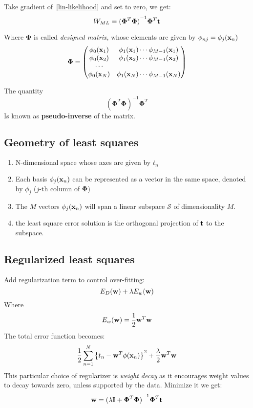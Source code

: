 Take gradient of~\ref{lin-likelihood} and set to zero, we get:
\begin{equation}
    W_{ML} = {(\boldsymbol\Phi^T\boldsymbol\Phi)}^{-1}\boldsymbol\Phi^T
    \boldsymbol{\mathsf{t}}
\end{equation}

Where $\boldsymbol\Phi$ is called \emph{designed matrix}, whose elements are
given by $\phi_{nj} = \phi_j(\mathbf{x}_n)$
\begin{equation}
    \boldsymbol\Phi = \begin{pmatrix}
        \phi_0(\mathbf{x}_1) & \phi_1(\mathbf{x}_1) \cdots \phi_{M-1}(\mathbf{x}_1) \\
        \phi_0(\mathbf{x}_2) & \phi_1(\mathbf{x}_2) \cdots \phi_{M-1}(\mathbf{x}_2)\\
        \cdots \\
        \phi_0(\mathbf{x}_N) & \phi_1(\mathbf{x}_N) \cdots \phi_{M-1}(\mathbf{x}_N) 
    \end{pmatrix}
\end{equation}

The quantity
\begin{equation}
    {(\boldsymbol\Phi^T\boldsymbol\Phi)}^{-1}\boldsymbol\Phi^T
\end{equation}
Is known as \textbf{pseudo-inverse} of the matrix.
\subsection{Geometry of least squares}
\begin{enumerate}
    \item N-dimensional space whose axes are given by $t_n$
    \item Each basis $\phi_j(\mathbf{x}_n)$ can be represented as a vector in the
    same space, denoted by $\phi_j$ ($j$-th column of $\boldsymbol\Phi$)
    \item The $M$ vectors $\phi_j(\mathbf{x}_n)$ will span a linear subspace
        $\mathcal{S}$ of dimensionality $M$.
    \item the least square error solution is the orthogonal projection of
        $\boldsymbol{\mathsf{t}}$ to the subspace.
\end{enumerate}

\subsection{Regularized least squares}
Add regularization term to control over-fitting:
\[ E_D(\mathbf{w}) + \lambda E_w(\mathbf{w})\]
Where
\[ E_w(\mathbf{w}) = \frac{1}{2} \mathbf{w}^T \mathbf{w}\]
The total error function becomes:
\[\frac{1}{2}\sum_{n=1}^{N} {\left\{ t_n - \mathbf{w}^T\phi(\mathbf{x}_n) \right\}}^2 +
\frac{\lambda}{2}\mathbf{w}^T\mathbf{w}\]
This particular choice of regularizer is \emph{weight decay} as it
encourages weight values to decay towards zero, unless supported by the
data. Minimize it we get:
\[\mathbf{w} = {(\lambda \mathbf{I} + \boldsymbol\Phi^T\boldsymbol\Phi)}^{-1}\boldsymbol\Phi^T\boldsymbol{\mathsf{t}} \]

